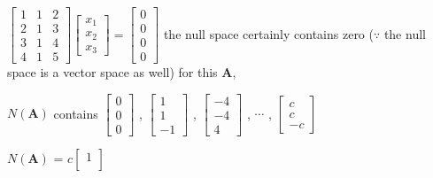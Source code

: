 \documentclass[12pt, a4paper]{article}
\begin{document}
{\begin{math}
	\begin{bmatrix}
		1 & 1 & 2 \\
		2 & 1 & 3 \\
		3 & 1 & 4 \\
		4 & 1 & 5 
	\end{bmatrix}
	\begin{bmatrix}
		x_1 \\
		x_2 \\
		x_3 
	\end{bmatrix}
	 = 
	\begin{bmatrix}
		0 \\
		0 \\
		0 \\
		0
	\end{bmatrix}
\end{math}
\newline
the null space certainly contains zero ($\because$ the null space is a vector space as well)
\newline
for this ${\mathbf{A}}$, 
\par\qquad $N({\mathbf{A}})$ contains 
\begin{math}
	\begin{bmatrix}
		0 \\
		0 \\
		0
	\end{bmatrix}
\end{math}
, 
\begin{math}
	\begin{bmatrix}
		1 \\
		1 \\
		-1
	\end{bmatrix}
\end{math}
, 
\begin{math}
	\begin{bmatrix}
		-4 \\
		-4 \\
		4
	\end{bmatrix}
\end{math}
, 
$\cdots$
, 
\begin{math}
	\begin{bmatrix}
		c \\
		c \\
		-c
	\end{bmatrix}
\end{math}
\par\qquad $N({\mathbf{A}})$ = 
\begin{math}
	c
	\begin{bmatrix}
		1 \\

\end{bmatrix}
\end{math}}
\end{document}
